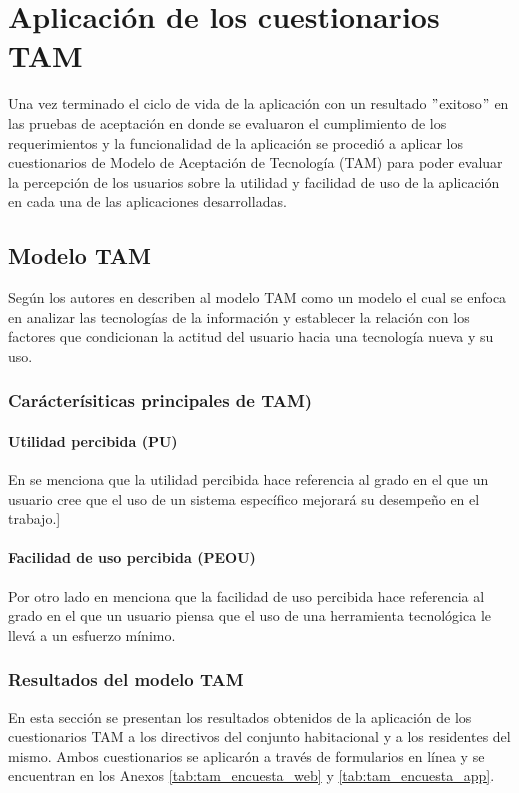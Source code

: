 \section{Aplicación de los cuestionarios TAM}\label{sec:aplicacion-de-los-cuestionarios-tam}

Una vez terminado el ciclo de vida de la aplicación con un resultado \("\)exitoso\("\) en las pruebas de aceptación en donde se evaluaron el cumplimiento de los requerimientos y la funcionalidad de la aplicación se procedió a aplicar los cuestionarios de Modelo de Aceptación de Tecnología (TAM) para poder evaluar la percepción de los usuarios sobre la utilidad y facilidad de uso de la aplicación en cada una de las aplicaciones desarrolladas.
\subsection{Modelo TAM}\label{subsec:modelo-tam}

Según los autores en \cite{tapia_leon_comparacion_2015} describen al modelo TAM como un modelo el cual se enfoca en analizar las tecnologías de la información y establecer la relación con los factores que condicionan la actitud del usuario hacia una tecnología nueva y su uso.
\subsubsection{Carácterísiticas principales de TAM)}\label{subsubsec:utilidad-percibida}
\paragraph{Utilidad percibida (PU)}
En \cite{varela_modelo_2010} se menciona que la utilidad percibida hace referencia al grado en el que un usuario cree que el uso de un sistema específico mejorará su desempeño en el trabajo.]
\paragraph{Facilidad de uso percibida (PEOU)}
Por otro lado en \cite{tapia_leon_comparacion_2015} menciona que la facilidad de uso percibida hace referencia al grado en el que un usuario piensa que el uso de una herramienta tecnológica le llevá a un esfuerzo mínimo.

\subsubsection{Resultados del modelo TAM}\label{subsubsec:cuestionarios-tam}
En esta sección se presentan los resultados obtenidos de la aplicación de los cuestionarios TAM a los directivos del conjunto habitacional y a los residentes del mismo.
Ambos cuestionarios se aplicarón a través de formularios en línea y se encuentran en los Anexos \ref{tab:tam_encuesta_web} y \ref{tab:tam_encuesta_app}.

